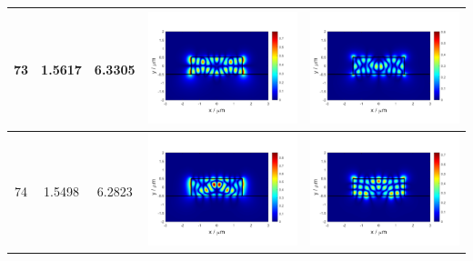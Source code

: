\documentclass{assignment}
\begin{document}
\begin{sol}
\begin{itemize}
\begin{longtable}[c]{|c|c|c|c|c|}
            73 & 1.5617 & 6.3305 & \includegraphics[width=.3\columnwidth]{Assignment-2-mode-73-Ex.png} & \includegraphics[width=.3\columnwidth]{Assignment-2-mode-73-Ey.png} \\ \hline
            74 & 1.5498 & 6.2823 & \includegraphics[width=.3\columnwidth]{Assignment-2-mode-74-Ex.png} & \includegraphics[width=.3\columnwidth]{Assignment-2-mode-74-Ey.png} \\ \hline
        \end{longtable}
    \end{itemize}
\end{sol}
\end{document}
